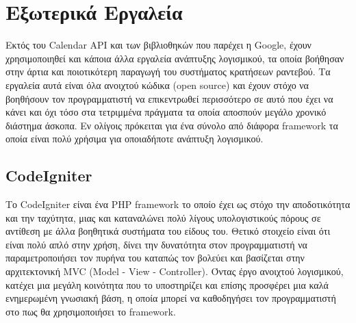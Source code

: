 
\chapter{Εξωτερικά Εργαλεία}
Εκτός του Calendar API και των βιβλιοθηκών που παρέχει η Google, έχουν χρησιμοποιηθεί και κάποια άλλα εργαλεία ανάπτυξης λογισμικού, τα οποία βοήθησαν στην άρτια και ποιοτικότερη παραγωγή του συστήματος κρατήσεων ραντεβού. Τα εργαλεία αυτά είναι όλα ανοιχτού κώδικα (open source) και έχουν στόχο να βοηθήσουν τον προγραμματιστή να επικεντρωθεί περισσότερο σε αυτό που έχει να κάνει και όχι τόσο στα τετριμμένα πράγματα τα οποία αποσπούν μεγάλο χρονικό διάστημα άσκοπα. Εν ολίγοις πρόκειται για ένα σύνολο από διάφορα framework τα οποία είναι πολύ χρήσιμα για οποιαδήποτε ανάπτυξη λογισμικού.

\section{CodeIgniter}
Το CodeIgniter είναι ένα PHP framework το οποίο έχει ως στόχο την αποδοτικότητα και την ταχύτητα, μιας και καταναλώνει πολύ λίγους υπολογιστικούς πόρους σε αντίθεση με άλλα βοηθητικά συστήματα του είδους του. Θετικό στοιχείο είναι ότι είναι πολύ απλό στην χρήση, δίνει την δυνατότητα στον προγραμματιστή να παραμετροποιήσει τον πυρήνα του καταπώς τον βολεύει και βασίζεται στην αρχιτεκτονική MVC (Model - View - Controller). Όντας έργο ανοιχτού λογισμικού, κατέχει μια μεγάλη κοινότητα που το υποστηρίζει και επίσης προσφέρει μια καλά ενημερωμένη γνωσιακή βάση, η οποία μπορεί να καθοδηγήσει τον προγραμματιστή στο πως θα χρησιμοποιήσει το framework.


